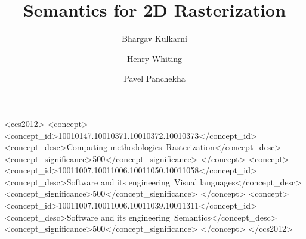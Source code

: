 \documentclass[acmsmall]{acmart}
\begin{document}
\title{Semantics for 2D Rasterization}

\author{Bhargav Kulkarni}
\correspondingauthor
{}

\author{Henry Whiting}

\author{Pavel Panchekha}



\begin{CCSXML}
<ccs2012>
   <concept>
       <concept_id>10010147.10010371.10010372.10010373</concept_id>
       <concept_desc>Computing methodologies~Rasterization</concept_desc>
       <concept_significance>500</concept_significance>
       </concept>
   <concept>
       <concept_id>10011007.10011006.10011050.10011058</concept_id>
       <concept_desc>Software and its engineering~Visual languages</concept_desc>
       <concept_significance>500</concept_significance>
       </concept>
   <concept>
       <concept_id>10011007.10011006.10011039.10011311</concept_id>
       <concept_desc>Software and its engineering~Semantics</concept_desc>
       <concept_significance>500</concept_significance>
       </concept>
 </ccs2012>
\end{CCSXML}




\maketitle









\end{document}
